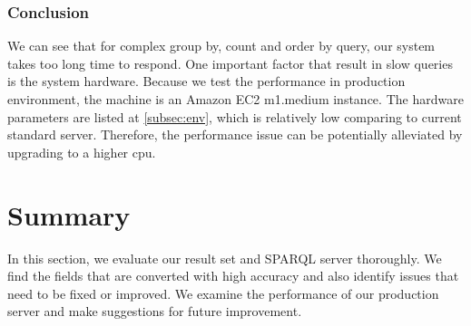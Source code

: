 \subsubsection{Conclusion}
We can see that for complex group by, count and order by query, our system takes too long time to respond. One important factor that result in slow queries is the system hardware. Because we test the performance in production environment, the machine is an Amazon EC2 m1.medium instance. The hardware parameters are listed at \autoref{subsec:env}, which is relatively low comparing to current standard server. Therefore, the performance issue can be potentially alleviated by upgrading to a higher \acrlong{cpu}.

\section{Summary}
In this section, we evaluate our result set and SPARQL server thoroughly. We find the fields that are converted with high accuracy and also identify issues that need to be fixed or improved. We examine the performance of our production server and make suggestions for future improvement.
